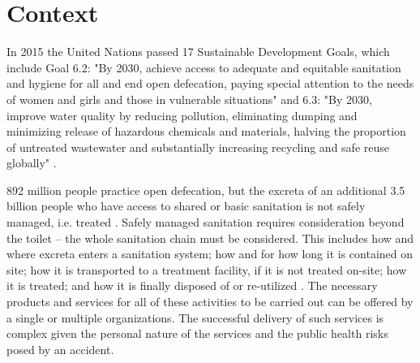 \documentclass[sustainability,article,submit,moreauthors,pdftex,10pt,a4paper]{mdpi}
\theoremstyle{mdpi}
\newcounter{ex}
\newcounter{re}
\theoremstyle{mdpidefinition}
\begin{document}





\section{Context}
In 2015 the United Nations passed 17 Sustainable Development Goals, which include Goal 6.2: "By 2030, achieve access to adequate and equitable sanitation and hygiene for all and end
open defecation, paying special attention to the needs of women and girls and those in vulnerable
situations" and 6.3: "By 2030, improve water quality by reducing pollution, eliminating dumping and minimizing release of hazardous chemicals and materials, halving the proportion of untreated wastewater and substantially increasing recycling and safe reuse globally" \cite{UNICEF2015}.

892 million people practice open defecation, but the excreta of an additional 3.5 billion people who have access to shared or basic sanitation is not safely managed, i.e. treated \cite{WHO2017}. Safely managed sanitation requires consideration beyond the toilet – the whole sanitation chain must be considered. This includes how and where excreta enters a sanitation system; how and for how long it is contained on site; how it is transported to a treatment facility, if it is not treated on-site; how it is treated; and how it is finally disposed of or re-utilized \cite{Tilley2014}. The necessary products and services for all of these activities to be carried out can be offered by a single or multiple organizations. The successful delivery of such services is complex given the personal nature of the services and the public health risks posed by an accident.  
%
%

\end{document}
